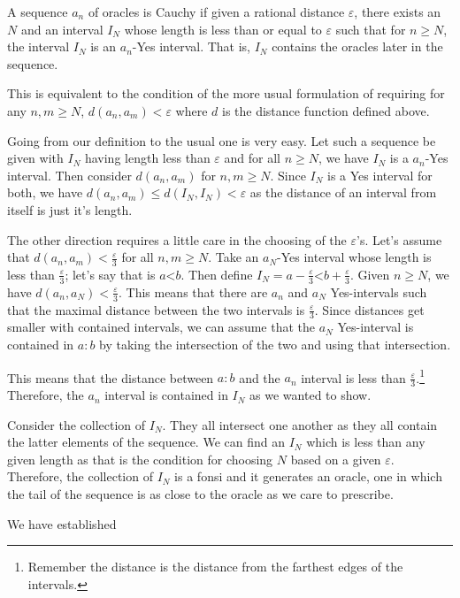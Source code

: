\documentclass[12pt]{article}
\theoremstyle{remark}
\newcommand{\lt}{\mathord{<}}
\begin{document}
A sequence $a_n$ of oracles is Cauchy if given a rational distance $\varepsilon$, there exists an $N$ and an interval $I_N$ whose length is less than or equal to $\varepsilon$ such that for $n \geq N$, the interval $I_N$ is an $a_n$-Yes interval. That is, $I_N$ contains the oracles later in the sequence. 

This is equivalent to the condition of the more usual formulation of requiring for any $n, m \geq N$, $d(a_n,  a_m) < \varepsilon$ where $d$ is the distance function defined above. 

Going from our definition to the usual one is very easy. Let such a sequence be given with $I_N$ having length less than $\varepsilon$ and for all $n \geq N$, we have $I_N$ is a $a_n$-Yes interval. Then consider $d(a_n, a_m)$ for $n, m \geq N$. Since $I_N$ is a Yes interval for both, we have $d(a_n, a_m) \leq d(I_N, I_N) < \varepsilon$ as the distance of an interval from itself is just it's length. 

The other direction requires a little care in the choosing of the $\varepsilon$'s. Let's assume that $d(a_n, a_m) < \frac{\varepsilon}{3}$ for all $n, m \geq N$. Take an $a_N$-Yes interval whose length is less than $\frac{\varepsilon}{3}$; let's say that is $a \lt b$. Then define $I_N = a-\frac{\varepsilon}{3} \lt b + \frac{\varepsilon}{3}$. Given $n \geq N$, we have $d(a_n, a_N) < \frac{\varepsilon}{3}$. This means that there are $a_n$ and $a_N$ Yes-intervals such that the maximal distance between the two intervals is $\frac{\varepsilon}{3}$. Since distances get smaller with contained intervals, we can assume that the $a_N$ Yes-interval is contained in $a:b$ by taking the intersection of the two and using that intersection. 

This means that the distance between $a:b$ and the $a_n$ interval is less than $\frac{\varepsilon}{3}$.\footnote{Remember the distance is the distance from the farthest edges of the intervals.} Therefore, the $a_n$ interval is contained in $I_N$ as we wanted to show.  

Consider the collection of $I_N$. They all intersect one another as they all contain the latter elements of the sequence. We can find an $I_N$ which is less than any given length as that is the condition for choosing $N$ based on a given $\varepsilon$. Therefore, the collection of $I_N$ is a fonsi and it generates an oracle, one in which the tail of the sequence is as close to the oracle as we care to prescribe. 

We have established
\end{document}
